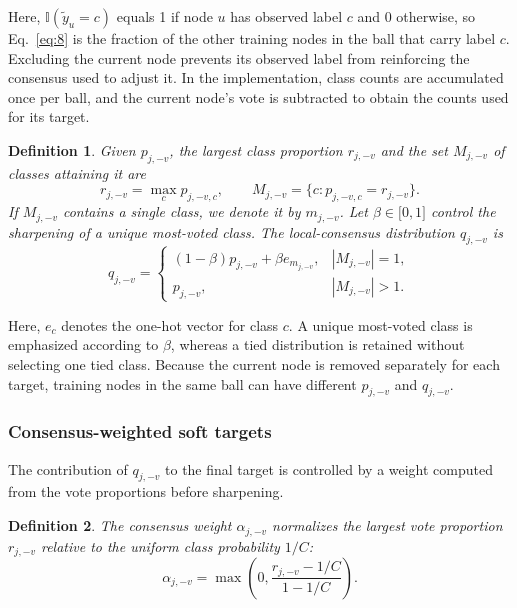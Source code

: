 \documentclass[10pt,letterpaper,nopreprintline]{elsarticle}
\theoremstyle{plain}
\newtheorem{definition}{Definition}
\begin{document}
Here, \(\mathbb I(\widetilde y_u=c)\) equals 1 if node \(u\) has observed label \(c\) and 0 otherwise, so Eq.~\eqref{eq:8} is the fraction of the other training nodes in the ball that carry label \(c\). Excluding the current node prevents its observed label from reinforcing the consensus used to adjust it. In the implementation, class counts are accumulated once per ball, and the current node's vote is subtracted to obtain the counts used for its target.

\Needspace{64pt}

\begin{definition}
Given \(p_{j, - v}\), the largest class proportion \(r_{j, - v}\) and the set \(M_{j, - v}\) of classes attaining it are
\begin{equation}\label{eq:9}
r_{j, - v} = \max_{c}p_{j, - v,c},\quad\quad M_{j, - v} = \{ c:p_{j, - v,c} = r_{j, - v}\}.
\end{equation}
If \(M_{j, - v}\) contains a single class, we denote it by \(m_{j, - v}\). Let \(\beta \in \lbrack 0,1\rbrack\) control the sharpening of a unique most-voted class. The local-consensus distribution \(q_{j, - v}\) is
\begin{equation}\label{eq:10}
q_{j, - v} = \begin{cases}
(1 - \beta)p_{j, - v} + \beta e_{m_{j, - v}}, & |M_{j, - v}| = 1, \\
p_{j, - v}, & |M_{j, - v}| > 1.
\end{cases}
\end{equation}
\end{definition}

Here, \(e_{c}\) denotes the one-hot vector for class \(c\). A unique most-voted class is emphasized according to \(\beta\), whereas a tied distribution is retained without selecting one tied class. Because the current node is removed separately for each target, training nodes in the same ball can have different \(p_{j, - v}\) and \(q_{j, - v}\).

\subsubsection{Consensus-weighted soft targets}\label{sec:3.3.2}

The contribution of \(q_{j, - v}\) to the final target is controlled by a weight computed from the vote proportions before sharpening.

\begin{definition}
The consensus weight \(\alpha_{j, - v}\) normalizes the largest vote proportion \(r_{j, - v}\) relative to the uniform class probability \(1/C\):
\begin{equation}\label{eq:11}
\alpha_{j, - v} = \max\left( 0,\frac{r_{j, - v} - 1/C}{1 - 1/C} \right).
\end{equation}
\end{definition}
\end{document}
